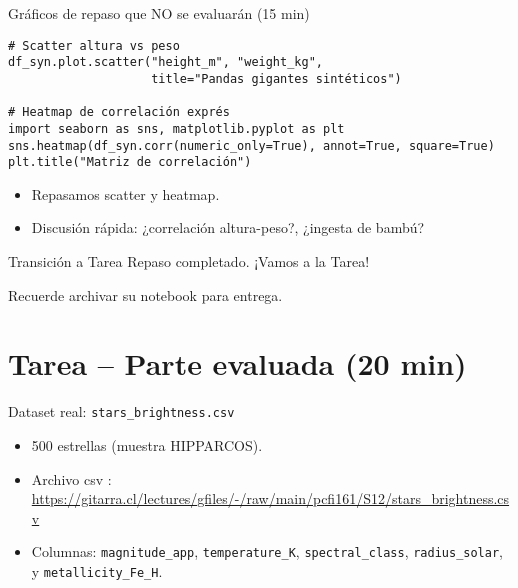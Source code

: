 \documentclass[10pt]{beamer}
\begin{document}
\begin{frame}[fragile]{Gráficos de repaso que NO se evaluarán (15 min)}
\begin{verbatim}
# Scatter altura vs peso
df_syn.plot.scatter("height_m", "weight_kg",
                    title="Pandas gigantes sintéticos")

# Heatmap de correlación exprés
import seaborn as sns, matplotlib.pyplot as plt
sns.heatmap(df_syn.corr(numeric_only=True), annot=True, square=True)
plt.title("Matriz de correlación")
\end{verbatim}

\begin{itemize}
  \item Repasamos scatter y heatmap.
  \item Discusión rápida: ¿correlación altura-peso?, ¿ingesta de bambú?
\end{itemize}
\end{frame}

\begin{frame}{Transición a Tarea}
\Large
Repaso completado. ¡Vamos a la Tarea!
\vspace{0.4cm}

\small
Recuerde archivar su notebook para entrega.
\end{frame}

\section{Tarea -- Parte evaluada (20 min)}

\begin{frame}{Dataset real: \texttt{stars\_brightness.csv}}
\begin{itemize}
  \item 500 estrellas (muestra HIPPARCOS).
  \item Archivo csv : \url{https://gitarra.cl/lectures/gfiles/-/raw/main/pcfi161/S12/stars_brightness.csv}
  \item Columnas: \texttt{magnitude\_app}, \texttt{temperature\_K},
        \texttt{spectral\_class}, \texttt{radius\_solar}, y \texttt{metallicity\_Fe\_H}.
\end{itemize}
\end{frame}
\end{document}
